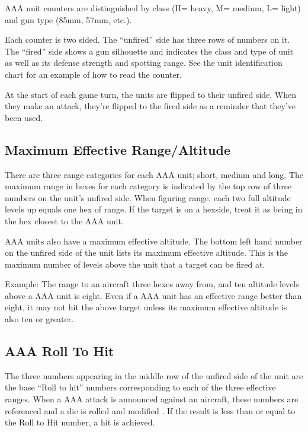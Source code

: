 

AAA unit counters are distinguished by class (H= heavy, M= medium, L= light) and gun type (85mm, 57mm, etc.).

Each counter is two sided. The “unfired” side has three rows of numbers on it. The “fired” side shows a gun silhouette and indicates the class and type of unit as well as its defense strength and spotting range. See the unit identification chart for an example of how to read the counter.

At the start of each game turn, the units are flipped to their unfired side. When they make an attack, they're flipped to the fired side as a reminder that they've been used.

\subsection{Maximum Effective Range/Altitude} There are three range categories for each AAA unit; short, medium and long. The maximum range in hexes for each category is indicated by the top row of three numbers on the unit's unfired side. When figuring range, each two full altitude levels up equals one hex of range. If the target is on a hexside, treat it as being in the hex closest to the AAA unit.

AAA units also have a maximum effective altitude. The bottom left hand number on the unfired side of the unit lists its maximum effective altitude. This is the maximum number of levels above the unit that a target can be fired at.

Example: The range to an aircraft three hexes away from, and ten altitude levels above a AAA unit is eight. Even if a AAA unit has an effective range better than eight, it may not hit the above target unless its maximum effective altitude is also ten or greater.

\subsection{AAA Roll To Hit}
The three numbers appearing in the middle row of the unfired side of the unit are the base “Roll to hit” numbers corresponding to each of the three effective ranges. When a AAA attack is announced against an aircraft, these numbers are referenced and a die is rolled and modified . If the result is less than or equal to the Roll to Hit number, a hit is achieved.

